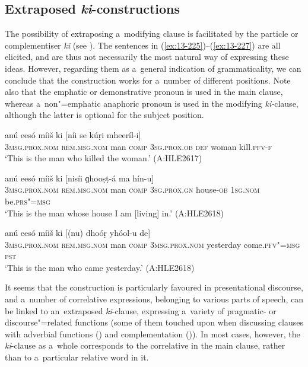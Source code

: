 \subsection{Extraposed \textit{ki}-constructions}
\label{subsec:13-6-7}

The possibility of extraposing a~modifying clause is facilitated by the particle or complementiser \textit{ki} (see ). The sentences in (\ref{ex:13-225})--(\ref{ex:13-227}) are all elicited, and are thus not necessarily the most natural way of expressing these ideas. However, regarding them as a~general indication of grammaticality, we can conclude that the construction works for a~number of different positions. Note also that the emphatic or demonstrative pronoun is used in the main clause, whereas a~non"=emphatic anaphoric pronoun is used in the modifying \textit{ki-}clause, although the latter is optional for the subject position.

\begin{exe}
\ex
\label{ex:13-225}
\gll anú eesó míiš ki [níi  se kúṛi mheeríl-i] \\
\textsc{3msg.prox.nom} \textsc{rem.msg.nom} man \textsc{comp} \textsc{3sg.prox.ob} \textsc{def} woman kill.\textsc{pfv-f} \\
\glt `This is the man who killed the woman.' (A:HLE2617)

\ex
\label{ex:13-226}
\gll anú eesó míiš ki [nisíi  ɡhooṣṭ-á ma hín-u] \\
\textsc{3msg.prox.nom} \textsc{rem.msg.nom} man \textsc{comp} \textsc{3sg.prox.gn} house-\textsc{ob} \textsc{1sg.nom} be.\textsc{prs"=msg} \\
\glt `This is the man whose house I am [living] in.' (A:HLE2618)

\ex
\label{ex:13-227}
\gll anú eesó míiš ki [(nu)  dhoóṛ yhóol-u de] \\
\textsc{3msg.prox.nom} \textsc{rem.msg.nom} man \textsc{comp} \textsc{3msg.prox.nom} yesterday come.\textsc{pfv"=msg} \textsc{pst} \\
\glt `This is the man who came yesterday.' (A:HLE2618) 
\end{exe}

It seems that the construction is particularly favoured in presentational discourse, and a~number of correlative expressions, belonging to various parts of speech, can be linked to an~extraposed \textit{ki}-clause, expressing a~variety of pragmatic- or discourse"=related functions (some of them touched upon when discussing clauses with adverbial functions () and complementation ()). In most cases, however, the \textit{ki}-clause as a~whole corresponds to the correlative in the main clause, rather than to a~particular relative word in it.

